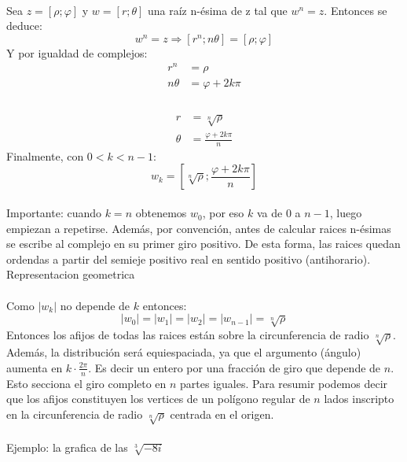 \documentclass[]{article}
\begin{document}
\\
Sea $ z = [\rho;\varphi]$ y $ w = [r;\theta]$ una raíz n-ésima de z tal que $w^{n} = z$.
Entonces se deduce:
$$
w^{n} = z \Rightarrow [r^{n};n\theta] = [\rho;\varphi]
$$
Y por igualdad de complejos:
\begin{align}
  r^{n} &= \rho\\
  n\theta &= \varphi +2k\pi \\
\end{align}
\\
\begin{align}
  r &= \sqrt[n]{\rho}\\
  \theta &= \frac{\varphi+2k\pi}{n}
\end{align}
Finalmente, con $ 0 < k < n-1$: 
$$
w_k = [\sqrt[n]{\rho};\frac{\varphi+2k\pi}{n}]
$$
\\
Importante: cuando $k=n$ obtenemos $w_0$, por eso  $k$ va de $0$ a $n-1$, luego empiezan a repetirse. Además, por convención, antes de calcular raices n-ésimas se escribe al complejo en su primer giro positivo. De esta forma, las raices quedan ordendas a partir del semieje positivo real en sentido positivo (antihorario).
\\
\large Representacion geometrica
\normalsize
\\
\\
Como $|w_k|$ no depende de $k$ entonces:
$$
|w_0| = |w_1| = |w_2| = |w_{n-1}| = \sqrt[n]{\rho}
$$
Entonces los afijos de todas las raices están sobre la circunferencia de radio $\sqrt[n]{\rho}$.
\\
Además, la distribución será equiespaciada, ya que el argumento (ángulo) aumenta en $k\cdot \frac{2\pi}{n}$. Es decir un entero por una fracción de giro que depende de $n$. Esto secciona el giro completo en $n$ partes iguales.
Para resumir podemos decir que los afijos constituyen los vertices de un polígono regular de $n$ lados inscripto en la circunferencia de radio $\sqrt[n]{\rho}$ centrada en el origen.
\\
\\
Ejemplo: la grafica de las $ \sqrt[3]{-8i}$
\end{document}
